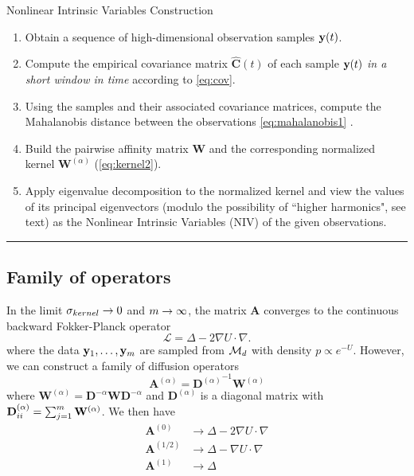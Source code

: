 \begin{algorithm}[th!]
\caption{Nonlinear Intrinsic Variables Construction}
\begin{enumerate}

\item
Obtain a sequence of high-dimensional observation samples $\mathbf{y}(t)$.

\item
Compute the empirical covariance matrix $\widehat{\mathbf{C}}(t)$ of each sample $\mathbf{y}(t)$ {\em in a short window in time} according to \eqref{eq:cov}.

\item
Using the samples and their associated covariance matrices, compute the Mahalanobis distance between the observations \eqref{eq:mahalanobis1} .

\item
Build the pairwise affinity matrix $\mathbf{W}$ and the corresponding normalized kernel $\mathbf{W}^{(\alpha)}$ (\ref{eq:kernel2}).

\item
Apply eigenvalue decomposition to the normalized kernel and view the values of its principal eigenvectors (modulo the possibility of
 ``higher harmonics", see text) as the Nonlinear Intrinsic Variables (NIV) of the given observations.

\end{enumerate}
\hrule
\label{algo}
\end{algorithm}


\subsection{Family of operators} \label{sec:diff_limit}

In the limit $\sigma_{kernel} \rightarrow 0$ and $m \rightarrow \infty$, the matrix $\mathbf{A}$ converges to the continuous backward Fokker-Planck operator \cite{nadler2006diffusion}
\begin{equation}
	\mathcal{L} = \Delta - 2 \nabla U \cdot \nabla.
	\label{eq:limiting_operator}
\end{equation}
where the data $\mathbf{y}_1, \dots , \mathbf{y}_m$ are sampled from $\mathcal{M}_d$ with density $p \propto e^{-U}$. 
%
However, we can construct a family of diffusion operators 
\begin{equation} \label{eq:kernel2}
\mathbf{A}^{(\alpha)} = {\mathbf{D}^{(\alpha)}}^{-1} \mathbf{W}^{(\alpha)}
\end{equation}
where $\mathbf{W}^{(\alpha)} = \mathbf{D}^{-\alpha} \mathbf{W} \mathbf{D}^{-\alpha}$ 
and $\mathbf{D}^{(\alpha)}$ is a diagonal matrix with $\mathbf{D}^{(\alpha)}_{ii} = \sum_{j=1}^m \mathbf{W}^{(\alpha)}$.
%
We then have \cite{coifman2005geometric}
\begin{equation}
\begin{aligned}
\mathbf{A}^{(0)} & \rightarrow \Delta - 2 \nabla U \cdot \nabla \\
\mathbf{A}^{(1/2)} & \rightarrow \Delta - \nabla U \cdot \nabla \\
\mathbf{A}^{(1)} & \rightarrow \Delta  
\end{aligned}
\end{equation}



